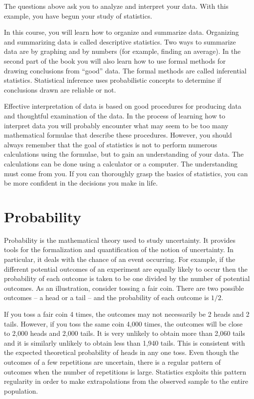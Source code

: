 \documentclass[
]{krantz}
\theoremstyle{definition}
\theoremstyle{definition}
\theoremstyle{definition}
\theoremstyle{remark}
\begin{document}
The questions above ask you to analyze and interpret your data. With this example, you have begun your study of statistics.

In this course, you will learn how to organize and summarize data. Organizing and summarizing data is called descriptive statistics. Two ways to summarize data are by graphing and by numbers (for example, finding an average). In the second part of the book you will also learn how to use formal methods for drawing conclusions from ``good'' data. The formal methods are called inferential statistics. Statistical inference uses probabilistic concepts to determine if conclusions drawn are reliable or not.

Effective interpretation of data is based on good procedures for producing data and thoughtful examination of the data. In the process of learning how to interpret data you will probably encounter what may seem to be too many mathematical formulae that describe these procedures. However, you should always remember that the goal of statistics is not to perform numerous calculations using the formulae, but to gain an understanding of your data. The calculations can be done using a calculator or a computer. The understanding must come from you. If you can thoroughly grasp the basics of statistics, you can be more confident in the decisions you make in life.

\hypertarget{probability}{%
\section{Probability}\label{probability}}

Probability is the mathematical theory used to study uncertainty. It provides tools for the formalization and quantification of the notion of uncertainty. In particular, it deals with the chance of an event occurring. For example, if the different potential outcomes of an experiment are equally likely to occur then the probability of each outcome is taken to be one divided by the number of potential outcomes. As an illustration, consider tossing a fair coin. There are two possible outcomes -- a head or a tail -- and the probability of each outcome is \(1/2\).

If you toss a fair coin 4 times, the outcomes may not necessarily be 2 heads and 2 tails. However, if you toss the same coin 4,000 times, the outcomes will be close to 2,000 heads and 2,000 tails. It is very unlikely to obtain more than 2,060 tails and it is similarly unlikely to obtain less than 1,940 tails. This is consistent with the expected theoretical probability of heads in any one toss. Even though the outcomes of a few repetitions are uncertain, there is a regular pattern of outcomes when the number of repetitions is large. Statistics exploits this pattern regularity in order to make extrapolations from the observed sample to the entire population.
\end{document}
